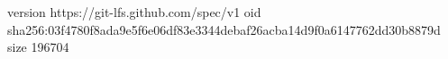 version https://git-lfs.github.com/spec/v1
oid sha256:03f4780f8ada9e5f6e06df83e3344debaf26acba14d9f0a6147762dd30b8879d
size 196704
